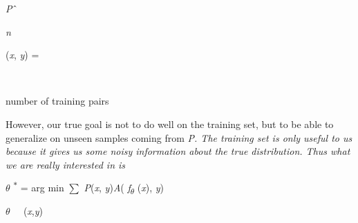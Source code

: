 \documentclass[12pt,twoside]{article}
\begin{document}
\vspace{\baselineskip}
\begin{multicols}{2}
\begin{FlushRight}
{\fontsize{10pt}{12.0pt}\selectfont \textit{P}$ \string^ $ {\fontsize{7pt}{8.4pt}\selectfont \textit{n}{\fontsize{10pt}{12.0pt}\selectfont (\textit{x}, \textit{y}) =\par}\par}\par}
\end{FlushRight}\par

\setlength{\parskip}{2.04pt}
\\

\vspace{\baselineskip}
\vspace{\baselineskip}
{\fontsize{10pt}{12.0pt}\selectfont number of training pairs\par}\par


\vspace{\baselineskip}

\end{multicols}
\setlength{\parskip}{0.0pt}
\begin{adjustwidth}{0.58in}{0.08in}
{\fontsize{10pt}{12.0pt}\selectfont However, our true goal is not to do well on the training set, but to be able to generalize on unseen samples coming from \textit{P. The training set is only useful to us because it gives us some noisy information about the true distribution. Thus what we are really interested in is}\par}\par

\end{adjustwidth}

\begin{adjustwidth}{2.78in}{0.0in}
\begin{FlushLeft}
{\fontsize{10pt}{12.0pt}\selectfont \textit{$ \theta $ }\textsuperscript{$\ast$ } = arg min $ \sum $  \textit{P}(\textit{x}, \textit{y})\textit{A}( \textit{f\textsubscript{$ \theta $ } }(\textit{x}), \textit{y})\par}
\end{FlushLeft}\par

\end{adjustwidth}

\begin{adjustwidth}{0.85in}{0.77in}
\begin{Center}
{\fontsize{7pt}{8.4pt}\selectfont \textit{$ \theta $ \ \  }(\textit{x},\textit{y})\par}
\end{Center}\par

\end{adjustwidth}
\end{document}
